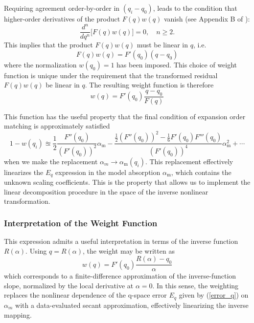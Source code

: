 \documentclass[8pt,a4paper]{report}
\begin{document}
	Requiring agreement order-by-order in $(q_i - q_0)$, leads to the condition that higher-order derivatives of the product $F(q)w(q)$ vanish (see Appendix B of \cite{mine_acetone}):
	\begin{equation}
		\frac{d^n}{dq^n}\big[F(q)w(q)\big] = 0, \quad n \geq 2.
	\end{equation}
	This implies that the product $F(q)w(q)$ must be linear in $q$, i.e.
	\begin{equation}
		F(q)w(q) = F'(q_0)(q - q_0)
	\end{equation}
	where the normalization $w(q_0)=1$ has been imposed. This choice of weight function is unique under the requirement that the transformed residual $F(q)w(q)$ be linear in $q$. The resulting weight function is therefore
	\begin{equation} \label{weight_function}
		w(q) = F'(q_0)\frac{q - q_0}{F(q)}
	\end{equation}
	
	This function has the useful property that the final condition of expansion order matching is approximately satisfied
	\begin{equation}
		1 - w(q_i) \approxeq \frac{1}{2}\frac{F''(q_0)}{\left(F'(q_0)\right)^2}\alpha_\mathrm{m} - \frac{\frac{1}{2}\left(F''(q_0)\right)^2 - \frac{1}{6}F'(q_0) F'''(q_0)}{\left(F'(q_0)\right)^4}\alpha_\mathrm{m}^2 + \cdots
	\end{equation}
	when we make the replacement $\alpha_m \rightarrow \alpha_\mathrm{m}(q_i)$. This replacement effectively linearizes the $E_q$ expression in the model absorption $\alpha_\mathrm{m}$, which contains the unknown scaling coefficients. This is the property that allows us to implement the linear decomposition procedure in the space of the inverse nonlinear transformation.
	
	
	\subsubsection{Interpretation of the Weight Function}
	This expression admits a useful interpretation in terms of the inverse function $R(\alpha)$. Using $q = R(\alpha)$, the weight may be written as
	\begin{equation}
		w(q) = F'(q_0)\frac{R(\alpha) - q_0}{\alpha}
	\end{equation}
	which corresponds to a finite-difference approximation of the inverse-function slope, normalized by the local derivative at $\alpha = 0$. In this sense, the weighting replaces the nonlinear dependence of the q-space error $E_q$ given by (\ref{error_q}) on $\alpha_m$ with a data-evaluated secant approximation, effectively linearizing the inverse mapping.
	
\end{document}
